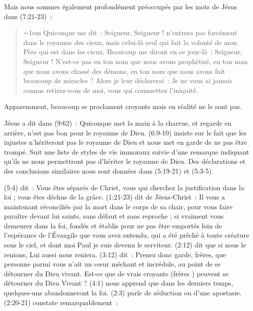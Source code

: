 Mais nous sommes également profondément préoccupés par les mots de Jésus dans (7:21-23)~:

\begin{quote}
\begin{digestpar}{}
\begin{pocketpar}{\emergencystretch=1em}
 \og Quiconque me dit~: Seigneur,
 Seigneur ! n'entrera pas forcément
 dans le royaume des cieux, mais celui-là seul qui fait la volonté de mon Père
 qui est dans les cieux. Beaucoup me diront en ce jour-là~: Seigneur, Seigneur !
 N'est-ce pas en ton nom que nous avons prophétisé, en ton nom que nous avons
 chassé des démons, en ton nom que nous avons fait beaucoup de miracles ?
 Alors je leur déclarerai~: Je ne vous ai jamais connus retirez-vous de moi,
 vous qui commettez l'iniquité. \fg{}
\end{pocketpar}
\end{digestpar}
\end{quote}

\begin{pocketpar}{}
Apparemment, beaucoup se pro\-cla\-ment croyants mais en réalité ne le sont pas.
\end{pocketpar}

Jésus a dit dans (9:62)~: \og Quiconque met la main à la charrue,
 et regarde en arrière, n'est pas bon pour le royaume de Dieu. \fg{}
 (6:9-10) insiste sur le fait que
 \og les injustes n'hériteront pas le royaume de Dieu \fg{}
 et nous met en garde de ne pas être trompé.
 Suit une liste de styles de vie immoraux suivie d'une remarque
 indiquant qu'ils ne nous permettront pas d'hériter le royaume de Dieu.
 Des déclarations et des conclusions similaires nous sont données
 dans (5:19-21) et (5:3-5).

(5:4) dit~:
 \og Vous êtes séparés de Christ, vous qui cherchez la justification
 dans la loi ; vous êtes déchus de la grâce. \fg{}
 (1:21-23) dit de Jésus-Christ~:
 \og Il vous a maintenant réconciliés par la mort dans le corps de sa chair,
 pour vous faire paraître devant lui saints, sans défaut et sans reproche ;
 si vraiment vous demeurez dans la foi, fondés et établis pour ne pas être
 emportés loin de l'espérance de l'Évangile que vous avez entendu,
 qui a été prêché à toute créature sous le ciel, et dont moi Paul
 je suis devenu le serviteur. \fg{}
 (2:12) dit que \og si nous le renions, Lui aussi nous reniera. \fg{}
 (3:12) dit~:
 \og Prenez donc garde, frères, que personne parmi vous n'ait un cœur méchant
 et incrédule, au point de se détourner du Dieu vivant. \fg{}
 Est-ce que de vrais croyants (\og frères \fg{}) peuvent se détourner du Dieu Vivant ?
 (4:1) nous apprend que \og dans les derniers temps,
 quelques-uns abandonneront la foi. \fg{}
 (2:3) parle de \og séduction \fg{} ou d'une apostasie.
 (2:20-21) constate remarquablement~:

